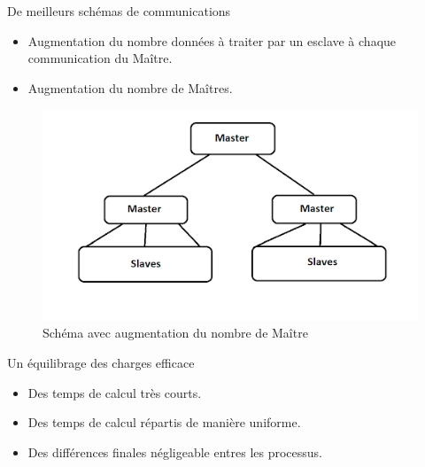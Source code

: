 \begin{frame}
\begin{block}{De meilleurs schémas de communications}
\begin{itemize}
\item Augmentation du nombre données à traiter par un esclave à chaque communication du Maître.\vspace{1em}
\item Augmentation du nombre de Maîtres.
\end{itemize}
\end{block}
\end{frame}

\begin{frame}
\begin{figure}[!ht]	
		\begin{center}\includegraphics[scale=0.55]{Masters2.png}\end{center}
		\caption{Schéma avec augmentation du nombre de Maître}
		\label{fg:fig12}
	\end{figure}
\end{frame}

\begin{frame}
\begin{block}{Un équilibrage des charges efficace}
\begin{itemize}
\item Des temps de calcul très courts.\vspace{1.5em}
\item Des temps de calcul répartis de manière uniforme. \vspace{1.5em}
\item Des différences finales négligeable entres les processus.\\
\end{itemize}
\end{block}

\end{frame}

